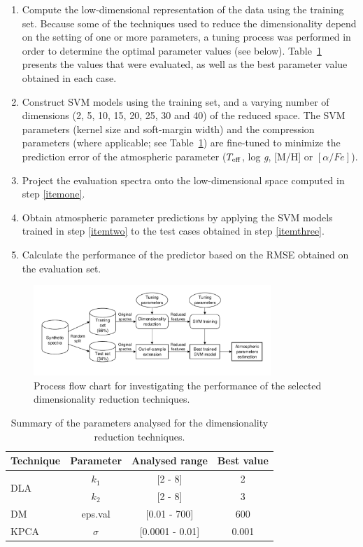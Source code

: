 \documentclass[a4paper,fleqn,usenatbib]{mnras}
\begin{document}
{{{\begin{enumerate}
\item \label{itemone} Compute the low-dimensional representation of
  the data using the training set. Because some of the techniques used
  to reduce the dimensionality depend on the setting of one or more
  parameters, a tuning process was performed in order to determine the
  optimal parameter values (see below). Table~\ref{tab:parameters} presents the
  values that were evaluated, as well as the best parameter value
  obtained in each case.
\item \label{itemtwo} Construct SVM models using the training set, and a varying
  number of dimensions (2, 5, 10, 15, 20, 25, 30 and 40) of the
  reduced space. The SVM parameters (kernel size and soft-margin
  width) and the compression parameters (where applicable; see 
  Table~\ref{tab:parameters}) are fine-tuned to minimize the prediction error of the
  atmospheric parameter ($T_{\rm eff}$, log \textit{g}, [M/H] or 
  $\left[ \alpha/Fe \right]$).
\item \label{itemthree} Project the evaluation spectra onto the
  low-dimensional space computed in step \ref{itemone}.
\item Obtain atmospheric parameter predictions by applying the SVM
  models trained in step \ref{itemtwo} to the test cases obtained in
  step \ref{itemthree}.
\item Calculate the performance of the predictor based on the RMSE
  obtained on the evaluation set.
\end{enumerate}

\begin{figure}[htb]
\centering\includegraphics[width=0.8\textwidth]{flowchart.pdf}
\caption{Process flow chart for investigating the performance of the 
selected dimensionality reduction techniques.}
\label{fig:flowchart}
\end{figure}

\begin{table}
\centering
\caption{Summary of the parameters analysed for the 
dimensionality reduction techniques.}
\label{tab:parameters}
\begin{tabular}{l c c c}
\hline
\textbf{Technique} & \textbf{Parameter} & \textbf{Analysed range} & \textbf{Best value} \\
\hline
\multirow{2}{*}{DLA} 
	& $k_1$ & [2 - 8]  & 2 \\\cline{2-4}
	& $k_2$ & [2 - 8]  & 3 \\\hline
DM & eps.val & [0.01 - 700] & 600 \\\hline
KPCA & $\sigma$ & [0.0001 - 0.01] & 0.001 \\
\hline
\end{tabular}
\end{table}

}}}
\end{document}
